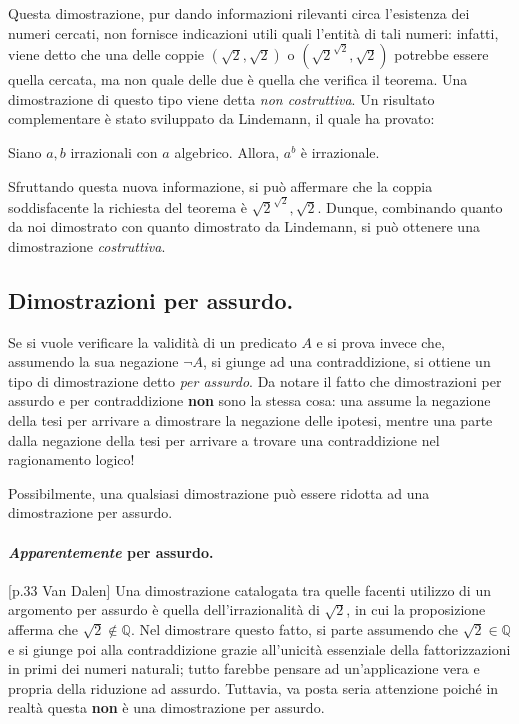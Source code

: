 Questa dimostrazione, pur dando informazioni rilevanti circa l'esistenza dei numeri cercati, non fornisce indicazioni utili quali l'entità di tali numeri: infatti, viene detto che una delle coppie \((\sqrt{2},\sqrt{2})\) o \((\sqrt{2}^{\sqrt{2}},\sqrt{2})\) potrebbe essere quella cercata, ma non quale delle due è quella che verifica il teorema. Una dimostrazione di questo tipo viene detta \emph{non costruttiva}. Un risultato complementare è stato sviluppato da Lindemann, il quale ha provato:
\begin{thm}[Lindemann]
  Siano \(a,b\) irrazionali con \(a\) algebrico. Allora, \(a^b\) è irrazionale.
\end{thm}
Sfruttando questa nuova informazione, si può affermare che la coppia soddisfacente la richiesta del teorema è \(\sqrt{2}^{\sqrt{2}}, \sqrt{2}\). Dunque, combinando quanto da noi dimostrato con quanto dimostrato da Lindemann, si può ottenere una dimostrazione \emph{costruttiva}.

\subsection{Dimostrazioni per assurdo.}
Se si vuole verificare la validità di un predicato \(A\) e si prova invece che, assumendo la sua negazione \(\lnot A\), si giunge ad una contraddizione, si ottiene un tipo di dimostrazione detto \emph{per assurdo}. Da notare il fatto che dimostrazioni per assurdo e per contraddizione {\bf non} sono la stessa cosa: una assume la negazione della tesi per arrivare a dimostrare la negazione delle ipotesi, mentre una parte dalla negazione della tesi per arrivare a trovare una contraddizione nel ragionamento logico!

Possibilmente, una qualsiasi dimostrazione può essere ridotta ad una dimostrazione per assurdo.

\paragraph{\emph{Apparentemente} per assurdo.}[p.33 Van Dalen] Una dimostrazione catalogata tra quelle facenti utilizzo di un argomento per assurdo è quella dell'irrazionalità di \(\sqrt{2}\), in cui la proposizione afferma che \(\sqrt{2} \notin \mathbb{Q}\). Nel dimostrare questo fatto, si parte assumendo che \(\sqrt{2} \in \mathbb{Q}\) e si giunge poi alla contraddizione grazie all'unicità essenziale della fattorizzazioni in primi dei numeri naturali; tutto farebbe pensare ad un'applicazione vera e propria della riduzione ad assurdo. Tuttavia, va posta seria attenzione poiché in realtà questa {\bf non} è una dimostrazione per assurdo.

